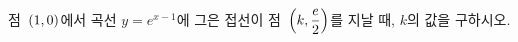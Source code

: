 점~$(1{,}\mkern3mu\mathopen{}0)$에서 곡선 $y=e^{x-1}$에 그은 접선이 점~$\left(k{,}\mkern3mu\mathopen{}\dfrac{e}{2}\right)$를 지날 때, $k$의 값을 구하시오.
